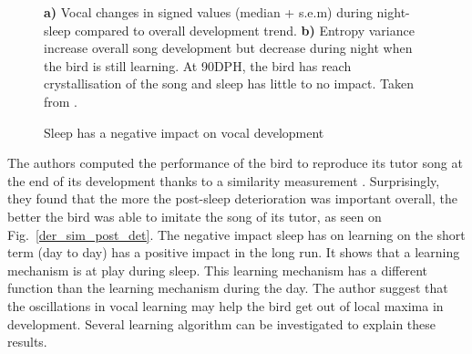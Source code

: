\documentclass{report}
\begin{document}
\begin{figure}[htpb]
  {\center
  }
  \caption{Sleep has a negative impact on vocal development}
  \small
  \textbf{a)} Vocal changes in signed values (median + s.e.m) during night-sleep compared to overall development trend.
  \textbf{b)} Entropy variance increase overall song development but decrease
  during night when the bird is still learning. At 90DPH, the bird has reach crystallisation of the song and sleep has little to no impact.
  Taken from \textcite{deregnaucourt_how_2005}.
\end{figure}

The authors computed the performance of the bird to reproduce its tutor song at
the end of its development thanks to a similarity measurement
\parencite[][developped in
section~\ref{measures}]{tchernichovski_procedure_2000}. Surprisingly, they found
that the more the post-sleep deterioration was important overall, the better the
bird was able to imitate the song of its tutor, as seen on
Fig.~\ref{der_sim_post_det}. The negative impact sleep has on learning on the
short term (day to day) has a positive impact in the long run. It shows that a
learning mechanism is at play during sleep. This learning mechanism has a
different function than the learning mechanism during the day. The author
suggest that the oscillations in vocal learning may help the bird get out of
local maxima in development. Several learning algorithm can be investigated to
explain these results.
\end{document}
